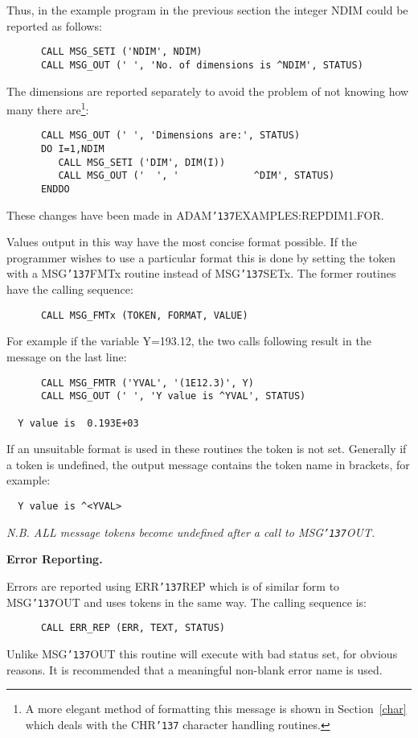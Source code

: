 \documentclass[twoside,11pt]{article}
\renewcommand{\_}{{\tt\char'137}}
\begin{document}
Thus, in the example program in the previous section the integer NDIM could
be reported as follows:
\begin{verbatim}
      CALL MSG_SETI ('NDIM', NDIM)
      CALL MSG_OUT (' ', 'No. of dimensions is ^NDIM', STATUS)
\end{verbatim}
The dimensions are reported separately to avoid the problem
of not knowing how many there are\footnote{A more elegant method of
formatting this message is shown in Section~\ref{char} which deals with
the CHR\_ character handling routines.}:
\begin{verbatim}
      CALL MSG_OUT (' ', 'Dimensions are:', STATUS)
      DO I=1,NDIM
         CALL MSG_SETI ('DIM', DIM(I))
         CALL MSG_OUT ('  ', '             ^DIM', STATUS)
      ENDDO
\end{verbatim}
These changes have been made in ADAM\_EXAMPLES:REPDIM1.FOR.

Values output in this way have the most concise format possible.
If the programmer wishes to use a particular format this is done
by setting the token with a MSG\_FMTx routine instead
of MSG\_SETx.
The former routines have the calling sequence:
\begin{verbatim}
      CALL MSG_FMTx (TOKEN, FORMAT, VALUE)
\end{verbatim}
For example if the variable Y=193.12, the two calls following result in the
message on the last line:
\begin{verbatim}
      CALL MSG_FMTR ('YVAL', '(1E12.3)', Y)
      CALL MSG_OUT (' ', 'Y value is ^YVAL', STATUS)

  Y value is  0.193E+03
\end{verbatim}
If an unsuitable format is used in these  routines the token is not set.
Generally if a token is undefined, the output message contains the token name
in brackets, for example:
\begin{verbatim}
  Y value is ^<YVAL>
\end{verbatim}
{\sl N.B. ALL message tokens become undefined after a call to MSG\_OUT.}

{\bigskip\large\bf Error Reporting.}

Errors are reported using ERR\_REP which is of similar form to
MSG\_OUT and uses tokens in the same way. The calling sequence is:
\begin{verbatim}
      CALL ERR_REP (ERR, TEXT, STATUS)
\end{verbatim}
Unlike MSG\_OUT this routine will execute with bad status set, for obvious
reasons.
It is recommended that a meaningful non-blank error name is used.
\end{document}
